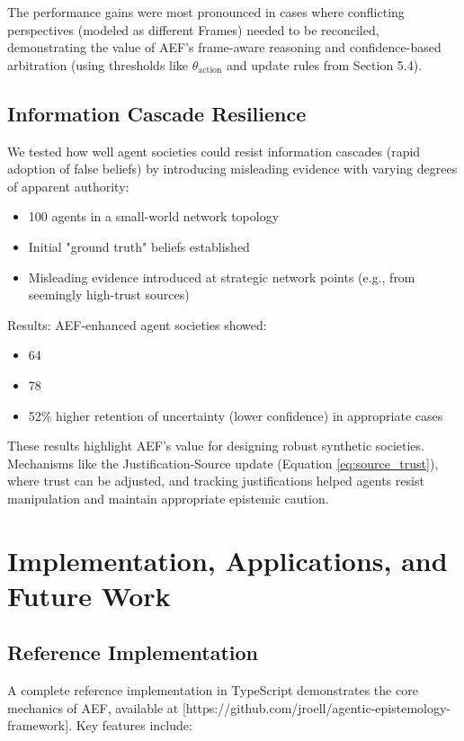 \documentclass[10pt,a4paper]{article}
\begin{document}
The performance gains were most pronounced in cases where conflicting perspectives (modeled as different Frames) needed to be reconciled, demonstrating the value of AEF's frame-aware reasoning and confidence-based arbitration (using thresholds like $\theta_{\mathrm{action}}$ and update rules from Section 5.4).

\subsection{Information Cascade Resilience}
We tested how well agent societies could resist information cascades (rapid adoption of false beliefs) by introducing misleading evidence with varying degrees of apparent authority:
\begin{itemize}
\item 100 agents in a small-world network topology
\item Initial "ground truth" beliefs established
\item Misleading evidence introduced at strategic network points (e.g., from seemingly high-trust sources)
\end{itemize}

Results: AEF-enhanced agent societies showed:
\begin{itemize}
\item 64%
\item 78%
\item 52\% higher retention of uncertainty (lower confidence) in appropriate cases
\end{itemize}

These results highlight AEF's value for designing robust synthetic societies. Mechanisms like the Justification-Source update (Equation \ref{eq:source_trust}), where trust can be adjusted, and tracking justifications helped agents resist manipulation and maintain appropriate epistemic caution.

\section{Implementation, Applications, and Future Work}
\subsection{Reference Implementation}
A complete reference implementation in TypeScript demonstrates the core mechanics of AEF, available at [https://github.com/jroell/agentic-epistemology-framework]. Key features include:
\end{document}
